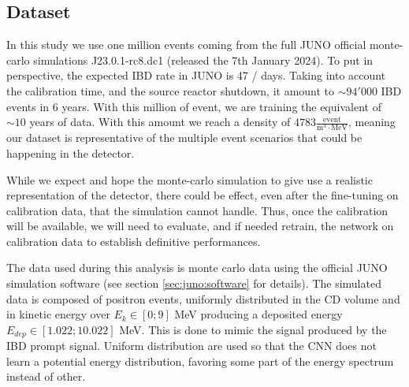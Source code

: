 \subsection{Dataset}


In this study we use one million events coming from the full JUNO official monte-carlo simulations J23.0.1-rc8.dc1 (released the 7th January 2024). To put in perspective, the expected IBD rate in JUNO is 47 / days. Taking into account the calibration time, and the source reactor shutdown, it amount to $\sim 94'000$ IBD events in 6 years. With this million of event, we are training the equivalent of $\sim 10$ years of data. With this amount we reach a density of $4783 \frac{\mathrm{event}}{\mathrm{m}^3\cdot\mathrm{MeV}}$, meaning our dataset is representative of the multiple event scenarios that could be happening in the detector.

While we expect and hope the monte-carlo simulation to give use a realistic representation of the detector, there could be effect, even after the fine-tuning on calibration data, that the simulation cannot handle. Thus, once the calibration will be available, we will need to evaluate, and if needed retrain, the network on calibration data to establish definitive performances.

The data used during this analysis is monte carlo data using the official JUNO simulation software (see section \ref{sec:juno:software} for details). The simulated data is composed of positron events, uniformly distributed in the CD volume and in kinetic energy over $E_k \in [0; 9]$ MeV producing a deposited energy $E_{dep} \in [1.022; 10.022]$ MeV. This is done to mimic the signal produced by the IBD prompt signal. Uniform distribution are used so that the CNN does not learn a potential energy distribution, favoring some part of the energy spectrum instead of other.

